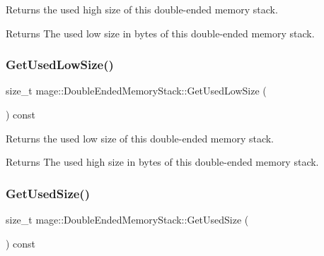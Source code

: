Returns the used high size of this double-\/ended memory stack.

\begin{DoxyReturn}{Returns}
The used low size in bytes of this double-\/ended memory stack. 
\end{DoxyReturn}
\mbox{\label{classmage_1_1_double_ended_memory_stack_af7fd015832d8c6c56619917492e62a2e}} 
\subsubsection{\texorpdfstring{Get\+Used\+Low\+Size()}{GetUsedLowSize()}}
{\footnotesize\ttfamily size\+\_\+t mage\+::\+Double\+Ended\+Memory\+Stack\+::\+Get\+Used\+Low\+Size (\begin{DoxyParamCaption}{ }\end{DoxyParamCaption}) const\hspace{0.3cm}{\ttfamily [noexcept]}}

Returns the used low size of this double-\/ended memory stack.

\begin{DoxyReturn}{Returns}
The used high size in bytes of this double-\/ended memory stack. 
\end{DoxyReturn}
\mbox{\label{classmage_1_1_double_ended_memory_stack_ae9c3c9a0f4e330b20ef63e0a21b91459}} 
\subsubsection{\texorpdfstring{Get\+Used\+Size()}{GetUsedSize()}}
{\footnotesize\ttfamily size\+\_\+t mage\+::\+Double\+Ended\+Memory\+Stack\+::\+Get\+Used\+Size (\begin{DoxyParamCaption}{ }\end{DoxyParamCaption}) const\hspace{0.3cm}{\ttfamily [noexcept]}}

